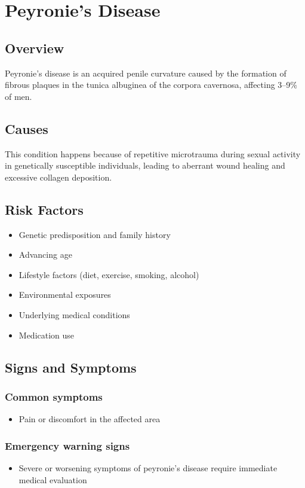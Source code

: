 \chapter{Peyronie's Disease}
\label{sec:Peyronie's Disease}

\section{Overview}
Peyronie's disease is an acquired penile curvature caused by the formation of fibrous plaques in the tunica albuginea of the corpora cavernosa, affecting 3--9\% of men.
\section{Causes}
This condition happens because of repetitive microtrauma during sexual activity in genetically susceptible individuals, leading to aberrant wound healing and excessive collagen deposition.     
\section{Risk Factors}

\begin{itemize}[noitemsep]
  \item Genetic predisposition and family history
  \item Advancing age
  \item Lifestyle factors (diet, exercise, smoking, alcohol)
  \item Environmental exposures
  \item Underlying medical conditions
  \item Medication use
\end{itemize}
\section{Signs and Symptoms}

\subsection{Common symptoms}
\begin{itemize}[noitemsep]
  \item Pain or discomfort in the affected area
  \end{itemize}

\subsection{Emergency warning signs}
\begin{itemize}[noitemsep]
  \item Severe or worsening symptoms of peyronie's disease require immediate medical evaluation
\end{itemize}
